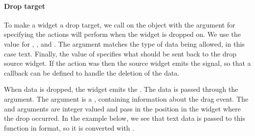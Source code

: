 \paragraph{Drop target}
To make a widget a drop target, we call  on
the object with the argument  for
specifying the actions \GTK\/ will perform when the widget is dropped
on. We use the value  for ,
, and . The
 argument matches the type of data
being allowed, in this case text. Finally, the value of
 specifies what 
should be sent back to the drop source widget. If the action was
 then the source widget emits the 
signal, so that a callback can be defined to handle the deletion of
the data.

 
\begin{Schunk}
\end{Schunk}

When data is dropped, the widget emits the
. The data is passed through the
 argument. The  argument is a
, containing information about the drag
event. The  and  arguments are integer valued and pass
in the position in the widget where the drop occurred. In the example
below, we see that text data is passed to this function in 
format, so it is converted with .

\begin{Schunk}
\end{Schunk}

